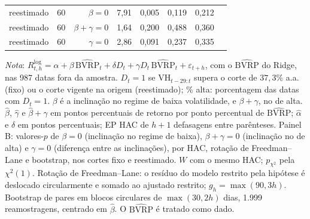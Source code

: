 \begin{table}[H]
\begin{tabular}{llrrrrrr}
reestimado & 60 & $\beta = 0$ & 7{,}91 & 0{,}005 & 0{,}119 & 0{,}212 & \\
reestimado & 60 & $\beta + \gamma = 0$ & 1{,}64 & 0{,}200 & 0{,}488 & 0{,}360 & \\
reestimado & 60 & $\gamma = 0$ & 2{,}86 & 0{,}091 & 0{,}237 & 0{,}335 & \\
\bottomrule
\end{tabular}
\par\smallskip
\parbox{0.95\linewidth}{\footnotesize\textit{Nota}: $R^{\log}_{t,h} = \alpha + \beta\,\widehat{\text{BVRP}}_t + \delta D_t + \gamma D_t\,\widehat{\text{BVRP}}_t + \varepsilon_{t+h}$, com o $\widehat{\text{BVRP}}$ do Ridge, nas 987 datas fora da amostra. $D_t = 1$ se $\text{VH}_{t-29:t}$ supera o corte de $37{,}3\%$ a.a. (fixo) ou o corte vigente na origem (reestimado); \% alta: porcentagem das datas com $D_t = 1$. $\beta$ é a inclinação no regime de baixa volatilidade, e $\beta + \gamma$, no de alta. $\hat\beta$, $\hat\gamma$ e $\hat\beta + \hat\gamma$ em pontos percentuais de retorno por ponto percentual de $\widehat{\text{BVRP}}$; $\hat\alpha$ e $\hat\delta$ em pontos percentuais; EP HAC de $h+1$ defasagens entre parênteses. Painel B: valores-$p$ de $\beta = 0$ (inclinação no regime de baixa), $\beta + \gamma = 0$ (inclinação no de alta) e $\gamma = 0$ (diferença entre as inclinações), por HAC, rotação de Freedman--Lane e bootstrap, nos cortes fixo e reestimado. $W$ com o mesmo HAC; $p_{\chi^2}$ pela $\chi^2(1)$. Rotação de Freedman--Lane: o resíduo do modelo restrito pela hipótese é deslocado circularmente e somado ao ajustado restrito; $g_h = \max(90, 3h)$. Bootstrap de pares em blocos circulares de $\max(30, 2h)$ dias, 1.999 reamostragens, centrado em $\hat\beta$. O $\widehat{\text{BVRP}}$ é tratado como dado.}
\end{table}
